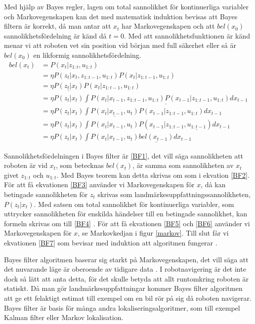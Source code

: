 Med hjälp av Bayes regler, lagen om total sannolikhet för kontinuerliga variabler och Markovegenskapen kan det med matematisk induktion bevisas att Bayes filtern är korrekt, då man antar att $x_t$ har Markovegenskapen och att $bel(x_0)$ sannolikhetsfördelning är känd då $t = 0$. Med att sannolikhetsfunktionen är känd menar vi att roboten vet sin position vid början med full säkerhet eller så är $bel(x_0)$ en likformig sannolikhetsfördelning.
\begin{align}
bel(x_t) & = P(x_t | z_{1:t}, u_{1:t}) \tag{BF1}\label{BF1} \\
        & = \eta P(z_t | x_t, z_{1:t-1}, u_{1:t}) P(x_t | z_{1:t-1}, u_{1:t}) \tag{BF2}\label{BF2}\\
        & = \eta \underline{P(z_t | x_t)} P(x_t | z_{1:t-1}, u_{1:t}) \tag{BF3}\label{BF3}\\
        & = \eta P(z_t | x_t) \underline{\int P(x_t | x_{t-1}, z_{1:t-1}, u_{1:t}) P(x_{t-1} | z_{1:t-1}, u_{1:t}) dx_{t-1}} \tag{BF4}\label{BF4}\\
        & = \eta P(z_t | x_t) \int \underline{P(x_t | x_{t-1}, u_t)} P(x_{t-1} | z_{1:t-1}, u_{1:t}) dx_{t-1} \tag{BF5}\label{BF5}\\
        & = \eta P(z_t | x_t) \int P(x_t | x_{t-1}, u_t) P(x_{t-1} | z_{1:t-1}, \underline{u_{1:t-1}}) dx_{t-1} \tag{BF6}\label{BF6}\\
        & = \eta P(z_t | x_t) \int P(x_t | x_{t-1}, u_t) \underline{bel(x_{t-1})} dx_{t-1} \tag{BF7}\label{BF7}
\end{align}

Sannolikhetsfördelningen i Bayes filter är \ref{BF1}, det vill säga sannolikheten att roboten är vid $x_t$, som betecknas $bel(x_t)$, är samma som sannolikheten av $x_t$ givet $z_{1:t}$ och $u_{1:t}$. Med Bayes teorem kan detta skrivas om som i ekvation \ref{BF2}. För att få ekvationen \ref{BF3} använder vi Markovegenskapen för $x$, då kan betingade sannolikheten för $z_t$ skrivas som landmärkesuppfattningssannolikheten, $P(z_t|x_t)$. Med satsen om total sannolikhet för kontinuerliga variabler, som uttrycker sannolikheten för enskilda händelser till en betingade sannolikhet, kan formeln skrivas om till \ref{BF4} \citep[Kapitel~2.2]{ProbabilisticRobotics}. För att få ekvationen \ref{BF5} och \ref{BF6} använder vi Markovegenskapen för $x$, se Markovkedjan i figur \ref{markov}. Till slut får vi ekvationen \ref{BF7} som bevisar med induktion att algoritmen fungerar \citep{ProbabilisticRobotics}.

Bayes filter algoritmen baserar sig starkt på Markovegenskapen, det vill säga att det nuvarande läge är oberoende av tidigare data \citep{ProbabilisticRobotics}. I robotnavigering är det inte dock så lätt att anta detta, för det skulle betyda att allt runtomkring roboten är statiskt. Då man gör landmärkesuppfattningar kommer Bayes filter algoritmen att ge ett felaktigt estimat till exempel om en bil rör på sig då roboten navigerar. Bayes filter är basis för många andra lokaliseringsalgoritmer, som till exempel Kalman filter eller Markov lokalisation. 

